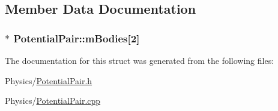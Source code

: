 \subsection{Member Data Documentation}
\subsubsection[{\texorpdfstring{m\+Bodies}{mBodies}}]{$\ast$ Potential\+Pair\+::m\+Bodies\mbox{[}2\mbox{]}}\hypertarget{structPotentialPair_ac665a312fd9f562ff48b503d5b7c774b}{}\label{structPotentialPair_ac665a312fd9f562ff48b503d5b7c774b}


The documentation for this struct was generated from the following files\+:\begin{DoxyCompactItemize}
\item 
Physics/\hyperlink{PotentialPair_8h}{Potential\+Pair.\+h}\item 
Physics/\hyperlink{PotentialPair_8cpp}{Potential\+Pair.\+cpp}\end{DoxyCompactItemize}
